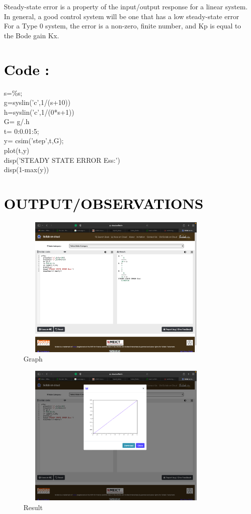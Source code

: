 \documentclass[12pt]{article}
\begin{document}
Steady-state error is a property of the input/output response for a linear system. In general, a good control system will be one that has a low steady-state error
For a Type 0 system, the error is a non-zero, finite number, and Kp is equal to the Bode gain Kx. \par

\section*{\textcolor{black}{Code :}}

   s=\%s;\\ 
   g=syslin('c',1/(s+10))\\
   h=syslin('c',1/(0*s+1))\\
   G= g/.h\\
   t= 0:0.01:5;\\
   y= csim('step',t,G);\\
   plot(t,y)\\
   disp('STEADY STATE ERROR Ess:')\\
   disp(1-max(y)) \par 

\section*{\textcolor{black}{OUTPUT/OBSERVATIONS}}

\begin{figure}[!hth]
        \centering
        \includegraphics[width =10cm, height = 7cm]{images/exp21.png}
        \caption{Graph}
        \label{Graph}
\end{figure}
\begin{figure}[!hth]
        \centering
        \includegraphics[width =10cm, height = 7cm]{images/exp22.png}
        \caption{Result}
        \label{Result}
\end{figure}
\end{document}
